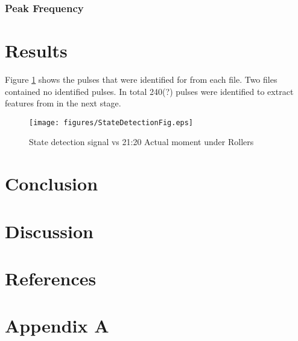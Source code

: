 \documentclass{article}
\begin{document}
\subsubsection{Peak Frequency}

\newpage  
\section{Results}
Figure \ref{fig:StateDetection} shows the pulses that were identified for from each file. Two files contained no identified pulses. In total 240(?) pulses were identified to extract features from in the next stage.

\begin{figure}[h!]
    \centering
    \texttt{[image: figures/StateDetectionFig.eps]}
    \caption{State detection signal vs 21:20 Actual moment under Rollers}
    \label{fig:StateDetection}
\end{figure}

\newpage  
\section{Conclusion}

\newpage 
\section{Discussion} 

\newpage  
\section{References} 

 

\newpage  
\section{Appendix A}
\end{document}
